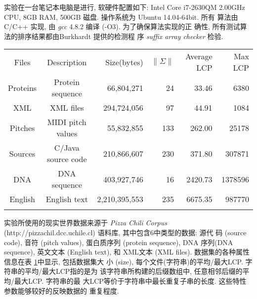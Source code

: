 \documentclass{ws-ijprai}
\begin{document}
实验在一台笔记本电脑是进行, 软硬件配置如下: Intel Core i7-2630QM
2.00GHz CPU, 8GB RAM, 500GB 磁盘. 操作系统为 Ubuntu 14.04-64bit.  所有
算法由 C/C++ 实现, 由 \emph{gcc} 4.8.2 编译 (-O3). 为了确保算法实现的正
确性, 所有测试算法的排序结果都由Burkhardt \cite{Burkhardt2003} 提供的检测程
序 \emph{suffix array checker} 检验.

\begin{table}[th]
{ \begin{tabular}{@{}ccrrrr@{}} \toprule
  Files & Description & Size(bytes) & $\|\Sigma\|$ & Average LCP & Max LCP \\ \colrule
 Proteins & Protein sequence & 66,804,271 & 24 & 33.46 & 6380\\
 XML & XML files & 294,724,056 & 97 & 44.91 & 1084 \\
 Pitches & MIDI pitch values & 55,832,855 & 133 & 262.00 & 25178\\
 Sources & C/Java source code & 210,866,607 & 230 & 371.80 & 307871\\
 DNA & DNA sequence & 403,927,746 & 16 & 2420.73 & 1378596\\
 English & English text & 2,210,395,553 & 235  &6675.35 & 987770\\ \botrule
  \end{tabular}}
  \label{tab:data}
\end{table}

实验所使用的现实世界数据来源于 \emph{Pizza Chili Corpus}
(http://pizzachil.dcc.uchile.cl) 语料库, 其中包含6中类型的数据: 源代
码 (source code), 音符 (pitch values), 蛋白质序列 (protein sequence),
DNA 序列(DNA sequence), 英文文本 (English text), 和 XML文本 (XML
files). 数据集的各种属性信息在表 \ref{tab:data}中显示, 包括数据集大
小 (size), 每个文件(字符串)的平均/最大LCP. 字符串的平均/最大LCP指的是为
该字符串所构建的后缀数组中, 任意相邻后缀的平均/最大LCP. 字符串的最
大LCP等价于字符串中最长重复子串的长度. 这些特性参数能够较好的反映数据的
重复程度.
\end{document}
